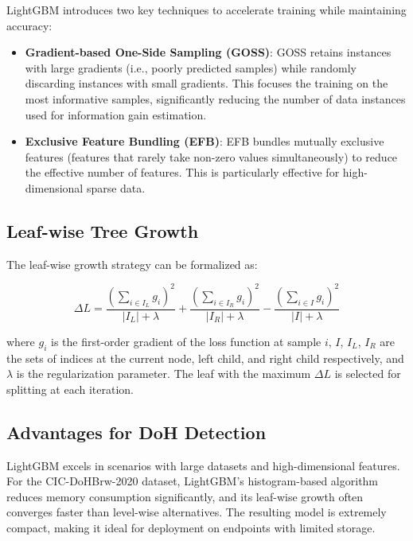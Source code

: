\documentclass[../Main.tex]{subfiles}
\begin{document}
LightGBM introduces two key techniques to accelerate training while maintaining accuracy:

\begin{itemize}
    \item \textbf{Gradient-based One-Side Sampling (GOSS)}: GOSS retains instances with large gradients (i.e., poorly predicted samples) while randomly discarding instances with small gradients. This focuses the training on the most informative samples, significantly reducing the number of data instances used for information gain estimation.
    \item \textbf{Exclusive Feature Bundling (EFB)}: EFB bundles mutually exclusive features (features that rarely take non-zero values simultaneously) to reduce the effective number of features. This is particularly effective for high-dimensional sparse data.
\end{itemize}

\subsection{Leaf-wise Tree Growth}

The leaf-wise growth strategy can be formalized as:

\begin{equation}
\Delta L = \frac{(\sum_{i \in I_L} g_i)^2}{|I_L| + \lambda} + \frac{(\sum_{i \in I_R} g_i)^2}{|I_R| + \lambda} - \frac{(\sum_{i \in I} g_i)^2}{|I| + \lambda}
\end{equation}

where $g_i$ is the first-order gradient of the loss function at sample $i$, $I$, $I_L$, $I_R$ are the sets of indices at the current node, left child, and right child respectively, and $\lambda$ is the regularization parameter. The leaf with the maximum $\Delta L$ is selected for splitting at each iteration.

\subsection{Advantages for DoH Detection}

LightGBM excels in scenarios with large datasets and high-dimensional features. For the CIC-DoHBrw-2020 dataset, LightGBM's histogram-based algorithm reduces memory consumption significantly, and its leaf-wise growth often converges faster than level-wise alternatives. The resulting model is extremely compact, making it ideal for deployment on endpoints with limited storage.
\end{document}

